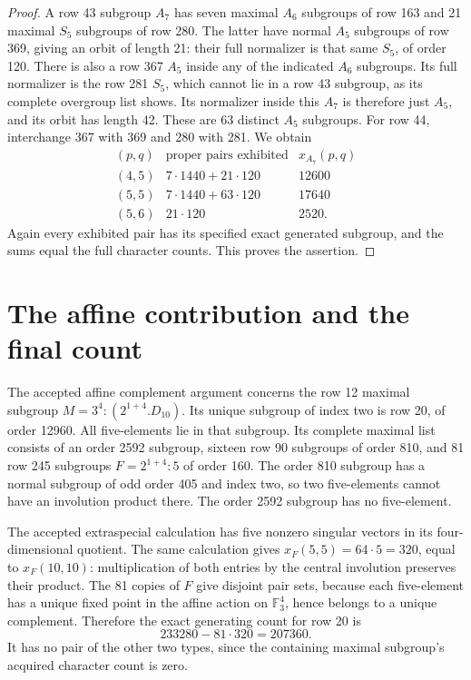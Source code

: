 \documentclass[11pt,a4paper]{article}
\begin{document}
\begin{proof}
A row 43 subgroup $A_7$ has seven maximal $A_6$ subgroups of row
163 and 21 maximal $S_5$ subgroups of row 280. The latter have
normal $A_5$ subgroups of row 369, giving an orbit of length 21:
their full normalizer is that same $S_5$, of order 120. There is
also a row 367 $A_5$ inside any of the indicated $A_6$ subgroups.
Its full normalizer is the row 281 $S_5$, which cannot lie in a
row 43 subgroup, as its complete overgroup list shows. Its
normalizer inside this $A_7$ is therefore just $A_5$, and its
orbit has length 42. These are 63 distinct $A_5$ subgroups. For
row 44, interchange 367 with 369 and 280 with 281. We obtain
\[
\begin{array}{c|r|r}
(p,q)&\text{proper pairs exhibited}&x_{A_7}(p,q)\\\hline
(4,5)&7\cdot1440+21\cdot120&12600\\
(5,5)&7\cdot1440+63\cdot120&17640\\
(5,6)&21\cdot120&2520.
\end{array}
\]
Again every exhibited pair has its specified exact generated
subgroup, and the sums equal the full character counts. This
proves the assertion.
\end{proof}

\section*{The affine contribution and the final count}
The accepted affine complement argument concerns the row 12
maximal subgroup $M=3^4:(2^{1+4}.D_{10})$. Its unique subgroup of
index two is row 20, of order 12960. All five-elements lie in
that subgroup. Its complete maximal list consists of an order
2592 subgroup, sixteen row 90 subgroups of order 810, and 81
row 245 subgroups $F=2^{1+4}:5$ of order 160. The order 810
subgroup has a normal subgroup of odd order 405 and index two,
so two five-elements cannot have an involution product there.
The order 2592 subgroup has no five-element.

The accepted extraspecial calculation has five nonzero singular
vectors in its four-dimensional quotient. The same calculation
gives $x_F(5,5)=64\cdot5=320$, equal to $x_F(10,10)$: multiplication
of both entries by the central involution preserves their product.
The 81 copies of $F$ give disjoint pair sets, because each
five-element has a unique fixed point in the affine action on
$\mathbb F_3^4$, hence belongs to a unique complement. Therefore
the exact generating count for row 20 is
\[
                       233280-81\cdot320=207360.
\tag{4}
\]
It has no pair of the other two types, since the containing
maximal subgroup's acquired character count is zero.
\end{document}
